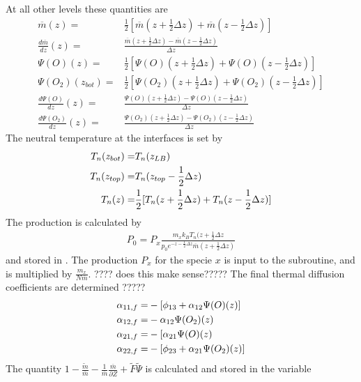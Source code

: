%
At all other levels these quantities are
%
\begin{align}
  \overline{m}(z) = & \frac{1}{2}[\overline{m}(z+\frac{1}{2}\Delta z)+
  \overline{m}(z-\frac{1}{2}\Delta z)] \\
  \frac{d \overline{m}}{dz}(z) = & \frac{\overline{m}(z+\frac{1}{2}\Delta z)
     - \overline{m}(z-\frac{1}{2}\Delta z)}{\Delta z} \\
  \Psi(O)(z)= &\frac{1}{2}[\Psi(O)(z+\frac{1}{2}\Delta z)+
    \Psi(O)(z-\frac{1}{2}\Delta z)] \\
  \Psi(O_2)(z_{bot})= &\frac{1}{2}[\Psi(O_2)(z+\frac{1}{2}\Delta z)+
    \Psi(O_2)(z-\frac{1}{2}\Delta z)] \\
  \frac{d \Psi(O)}{dz}(z) = & \frac{\Psi(O)(z+\frac{1}{2}\Delta z)
     - \Psi(O)(z-\frac{1}{2}\Delta z)}{\Delta z} \\
  \frac{d \Psi(O_2)}{dz}(z) = & \frac{\Psi(O_2)(z+\frac{1}{2}\Delta z)
     - \Psi(O_2)(z-\frac{1}{2}\Delta z)}{\Delta z}
\end{align}
%
The neutral temperature at the interfaces is set by
%
\begin{align}
  T_n(z_{bot}) = & T_n(z_{LB}) \notag \\
  T_n(z_{top}) = & T_n(z_{top}-\frac{1}{2} \Delta z) \notag \\
  T_n(z) = & \frac{1}{2} [ T_n(z + \frac{1}{2}\Delta z) + T_n(z - \frac{1}{2}\Delta
  z)]
\end{align}
%
The production is calculated by
%
\begin{align}
  P_0 = P_x \frac{m_x k_B T_n(z+\frac{1}{2}\Delta z}
       {p_0 e^{-z-\frac{1}{2}\Delta z}\overline{m}(z+\frac{1}{2}\Delta z)}
\end{align}
%
and stored in . The production $P_x$ for the specie $x$
is input to the subroutine, and is multiplied by $\frac{m_x}{N
\overline{m}}$. ???? does this make sense?????
%
The final thermal diffusion coefficients are determined ?????
%
\begin{align}
  \alpha_{11,f} = & -[\phi_{13}+\alpha_{12}\Psi(O)(z)] \notag \\
  \alpha_{12,f} = & -\alpha_{12}\Psi(O_2)(z) \notag \\
  \alpha_{21,f} = & -[\alpha_{21}\Psi(O)(z) \notag \\
  \alpha_{22,f} = & -[\phi_{23}+\alpha_{21}\Psi(O_2)(z)] \notag \\
\end{align}
%
The quantity $1
-\frac{\tilde{m}}{\overline{m}}-\frac{1}{\overline{m}}\frac{\overline{m}}{\partial
Z} +\tilde{F} \tilde{\Psi}$ is calculated and stored in the variable
